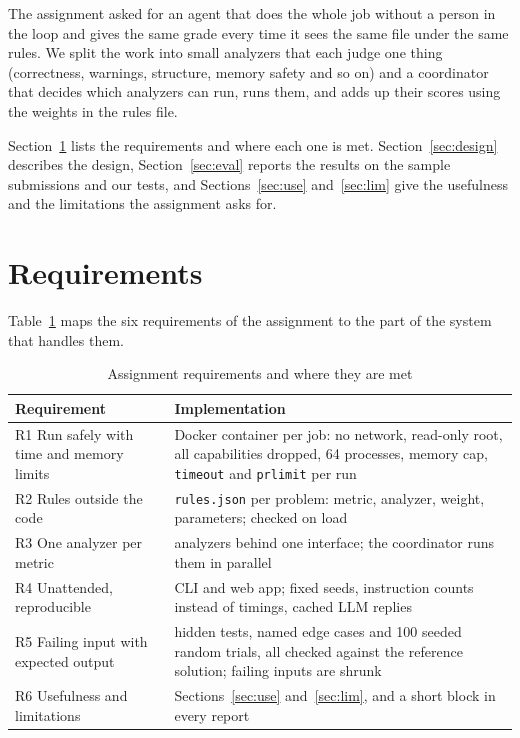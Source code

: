 \documentclass[conference]{IEEEtran}
\newcommand{\code}[1]{\texttt{#1}}
\begin{document}
The assignment asked for an agent that does the whole job without a person in the loop and
gives the same grade every time it sees the same file under the same rules. We split the work
into small analyzers that each judge one thing (correctness, warnings, structure, memory
safety and so on) and a coordinator that decides which analyzers can run, runs them, and adds
up their scores using the weights in the rules file.

Section~\ref{sec:req} lists the requirements and where each one is met.
Section~\ref{sec:design} describes the design, Section~\ref{sec:eval} reports the results on
the sample submissions and our tests, and Sections~\ref{sec:use} and~\ref{sec:lim} give the
usefulness and the limitations the assignment asks for.

\section{Requirements}\label{sec:req}
Table~\ref{tab:req} maps the six requirements of the assignment to the part of the system that
handles them.

\begin{table}[!t]
\caption{Assignment requirements and where they are met}\label{tab:req}
\centering\footnotesize
\begin{tabular}{@{}>{\raggedright\arraybackslash}p{}>{\raggedright\arraybackslash}p{}@{}}
\toprule
Requirement & Implementation \\
\midrule
R1 Run safely with time and memory limits & Docker container per job: no network, read-only root, all capabilities dropped, 64 processes, memory cap, \code{timeout} and \code{prlimit} per run \\
R2 Rules outside the code & \code{rules.json} per problem: metric, analyzer, weight, parameters; checked on load \\
R3 One analyzer per metric & 11 analyzers behind one interface; the coordinator runs them in parallel \\
R4 Unattended, reproducible & CLI and web app; fixed seeds, instruction counts instead of timings, cached LLM replies \\
R5 Failing input with expected output & hidden tests, named edge cases and 100 seeded random trials, all checked against the reference solution; failing inputs are shrunk \\
R6 Usefulness and limitations & Sections~\ref{sec:use} and~\ref{sec:lim}, and a short block in every report \\
\bottomrule
\end{tabular}
\end{table}
\end{document}
